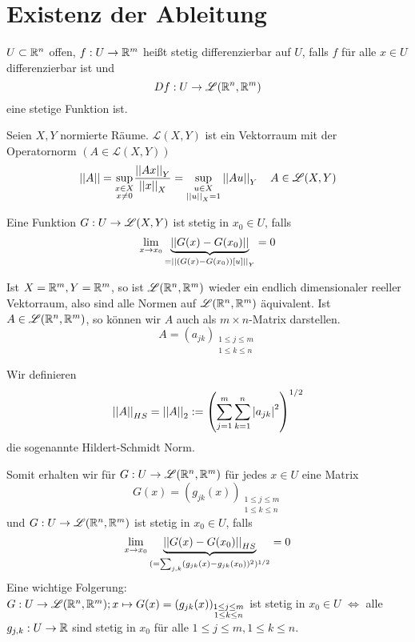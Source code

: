 \documentclass[../ana2.tex]{subfiles}
\begin{document}
\setcounter{section}{11}
\section{Existenz der Ableitung}
\begin{defi}
    \(U \subset \mathbb{R}^n \) offen, \(f:U\rightarrow \mathbb{R}^m\) heißt
    stetig differenzierbar auf \(U\), falls \(f\) für alle
    \(x \in U\) differenzierbar ist und    
    \[ Df:U\rightarrow \mathscr{L}(\mathbb{R}^n, \mathbb{R}^m) \]
    eine stetige Funktion ist.
\end{defi}
\begin{bem}
    Seien \(X, Y\) normierte Räume. 
    \( \mathscr{L}(X,Y) \) ist ein Vektorraum mit
    der Operatornorm \( (A \in \mathscr{L}(X,Y)) \)
    \[ \left|\left|A\right|\right| = \underset{\substack{x\in X\\x\neq 0}}{\sup}
    \frac{\left|\left|Ax\right|\right|_Y}{\left|\left|x\right|\right|_X} 
    = \underset{\substack{u\in X\\ \left|\left|u\right|\right|_X = 1}}{\sup}
    \left|\left|Au\right|\right|_Y
    \quad A \in \mathscr{L}(X,Y) \]
\end{bem}
\begin{bem}
    Eine Funktion \(G:U\rightarrow \mathscr{L}(X,Y)\) ist 
    stetig in \(x_0 \in U\), falls 
    \[ \lim\limits_{x\rightarrow{}x_0} \underbrace{\left|\left|G(x) - G(x_0)\right|\right|}_{
        = \left|\left|(G(x) - G(x_0))[u]\right|\right|_Y
    } = 0 \]
\end{bem}
Ist \(X=\mathbb{R}^m, Y = \mathbb{R}^m\), so ist \(\mathscr{L}(\mathbb{R}^n, \mathbb{R}^m)\)
wieder ein endlich dimensionaler reeller Vektorraum, also sind 
alle Normen auf \( \mathscr{L}(\mathbb{R}^n, \mathbb{R}^m) \) äquivalent.
Ist \( A \in \mathscr{L}(\mathbb{R}^n, \mathbb{R}^m) \), so können wir \(A\) 
auch als \( m \times n \)-Matrix darstellen.
\[ A = (a_{jk})_{\substack{ 1 \leq j \leq m\\1 \leq k \leq n }} \]
\begin{defi*}
    Wir definieren
    \[ \left|\left|A\right|\right|_{HS} = \left|\left|A\right|\right|_2 := \left( 
        \sum_{j=1}^m \sum_{k=1}^n \left|a_{jk}\right|^2 \right)^{1/2} \]
    die sogenannte Hildert-Schmidt Norm.
\end{defi*}
Somit erhalten wir für \( G:U\rightarrow \mathscr{L}(\mathbb{R}^n, \mathbb{R}^m) \) 
für jedes \( x \in U \) eine Matrix
\[ G(x) = (g_{jk}(x))_{\substack{1 \leq j \leq m \\ 
1 \leq k \leq n}} \]
und \( G:U\rightarrow \mathscr{L}(\mathbb{R}^n, \mathbb{R}^m) \) ist stetig 
in \(x_0 \in U\), falls
\[ \lim\limits_{x\rightarrow{}x_0} \underbrace{\left|\left|G(x) - G(x_0)\right|\right|_{HS}}_{
    (= \sum_{j,k} (g_{jk}(x)-g_{jk}(x_0))^2)^{1/2}} = 0 \]
Eine wichtige Folgerung:\\
\( G:U\rightarrow \mathscr{L}(\mathbb{R}^n, \mathbb{R}^m); x \mapsto G(x) 
= (g_{jk}(x))_{\substack{1 \leq j \leq m 
\\ 1 \leq k \leq n}} \)
ist stetig in \( x_0 \in U \)
\( \Leftrightarrow \) alle \( g_{j,k}:U\rightarrow \mathbb{R} \) 
sind stetig in \(x_0\) für alle 
\( 1 \leq j \leq m, 1 \leq k \leq n \).\\
\end{document}
